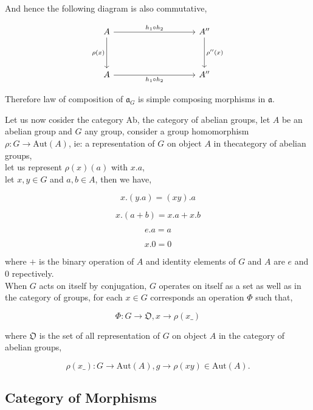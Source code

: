 \documentclass[11pt,a4paper]{colorart}
\def\mab{\mathfrak}
\def\ra{\rightarrow}
\begin{document}
And hence the following diagram is also commutative,

\[\begin{tikzcd}
	A &&&& {A^{\prime\prime}} \\
	\\
	A &&&& {A^{\prime\prime}}
	\arrow["{\rho(x)}"', from=1-1, to=3-1]
	\arrow["{\rho^{\prime \prime}(x)}", from=1-5, to=3-5]
	\arrow["{h_1 \circ h_2}", from=1-1, to=1-5]
	\arrow["{h_1 \circ h_2}"', from=3-1, to=3-5]
\end{tikzcd}\]

Therefore law of composition of $\mab{a}_G$ is simple composing morphisms in $\mab{a}$.

Let us now cosider the category Ab, the category of abelian groups, let $A$ be an abelian group and $G$ any group, consider a group homomorphism $\rho : G \ra \text{Aut}(A)$, ie: a representation of $G$ on object $A$ in thecategory of abelian groups,\\

let us represent $\rho(x)(a)$ with $x . a$, \\

let $x,y \in G$ and $a,b \in A$, then we have,

\[ x.(y.a) = (xy).a \]

\[ x.(a+b) = x.a + x.b \]

\[ e.a = a \]

\[ x.0 = 0 \]

where $+$ is the binary operation of $A$ and identity elements of $G$ and $A$ are $e$ and $0$ repectively.\\

When $G$ acts on itself by conjugation, $G$ operates on itself as a set as well as in the category of groups, for each $x\in G$ corresponds an operation $\Phi$ such that,

\[ \Phi : G \ra \mab{O}, x \ra \rho(x \_) \]

where $\mab{O}$ is the set of all representation of $G$ on object $A$ in the category of abelian groups,

\[ \rho(x\_) : G \ra \text{Aut}(A), g \ra \rho(xy) \in \text{Aut}(A). \]

\subsection{Category of Morphisms}
\end{document}
